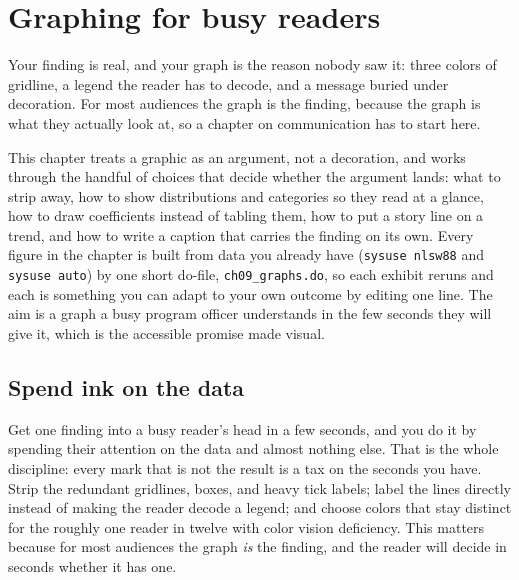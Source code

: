 \documentclass[
    a4paper,
    fontsize=10pt,
    twoside=true,
    numbers=noenddot,
]{kaobook}
\begin{document}


\chapter{Graphing for busy readers}\label{ch:graphs}

Your finding is real, and your graph is the reason nobody saw it: three colors of gridline, a legend the reader has to decode, and a message buried under decoration. For most audiences the graph is the finding, because the graph is what they actually look at, so a chapter on communication has to start here.

This chapter treats a graphic as an argument, not a decoration, and works through the handful of choices that decide whether the argument lands: what to strip away, how to show distributions and categories so they read at a glance, how to draw coefficients instead of tabling them, how to put a story line on a trend, and how to write a caption that carries the finding on its own. Every figure in the chapter is built from data you already have (\texttt{sysuse nlsw88} and \texttt{sysuse auto}) by one short do-file, \texttt{ch09\_graphs.do}, so each exhibit reruns and each is something you can adapt to your own outcome by editing one line. The aim is a graph a busy program officer understands in the few seconds they will give it, which is the accessible promise made visual.

\section{Spend ink on the data}
Get one finding into a busy reader's head in a few seconds, and you do it by spending their attention on the data and almost nothing else. That is the whole discipline: every mark that is not the result is a tax on the seconds you have. Strip the redundant gridlines, boxes, and heavy tick labels; label the lines directly instead of making the reader decode a legend; and choose colors that stay distinct for the roughly one reader in twelve with color vision deficiency. This matters because for most audiences the graph \emph{is} the finding, and the reader will decide in seconds whether it has one.
\end{document}
